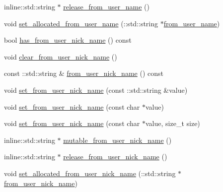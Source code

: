 \begin{DoxyCompactItemize}
\item 
inline\+::std\+::string $\ast$ \hyperlink{class_i_m_1_1_base_define_1_1_client_msg_info_a8624ef942e3870137370b2aa3bdf6dae}{release\+\_\+from\+\_\+user\+\_\+name} ()
\item 
void \hyperlink{class_i_m_1_1_base_define_1_1_client_msg_info_a566afc77ad72538f0868d49610a57e44}{set\+\_\+allocated\+\_\+from\+\_\+user\+\_\+name} (\+::std\+::string $\ast$\hyperlink{class_i_m_1_1_base_define_1_1_client_msg_info_a060e0792835ddff97e357b7a272e2b24}{from\+\_\+user\+\_\+name})
\item 
bool \hyperlink{class_i_m_1_1_base_define_1_1_client_msg_info_a04e89e498e131534844a34ac80b51e64}{has\+\_\+from\+\_\+user\+\_\+nick\+\_\+name} () const 
\item 
void \hyperlink{class_i_m_1_1_base_define_1_1_client_msg_info_aa51eaebe3f5cfc523a98f7a0da032b3c}{clear\+\_\+from\+\_\+user\+\_\+nick\+\_\+name} ()
\item 
const \+::std\+::string \& \hyperlink{class_i_m_1_1_base_define_1_1_client_msg_info_adbdf72fc39015be4ff758a5fdd28b256}{from\+\_\+user\+\_\+nick\+\_\+name} () const 
\item 
void \hyperlink{class_i_m_1_1_base_define_1_1_client_msg_info_a7419e1fd819fbfc3629b7c890bb6385d}{set\+\_\+from\+\_\+user\+\_\+nick\+\_\+name} (const \+::std\+::string \&value)
\item 
void \hyperlink{class_i_m_1_1_base_define_1_1_client_msg_info_a1ce4c2a9387e92f24d1c8f42a2ec2e01}{set\+\_\+from\+\_\+user\+\_\+nick\+\_\+name} (const char $\ast$value)
\item 
void \hyperlink{class_i_m_1_1_base_define_1_1_client_msg_info_af66214329b676d68b9497b98b882663e}{set\+\_\+from\+\_\+user\+\_\+nick\+\_\+name} (const char $\ast$value, size\+\_\+t size)
\item 
inline\+::std\+::string $\ast$ \hyperlink{class_i_m_1_1_base_define_1_1_client_msg_info_ab719bf758574d8d7804719018cb83ac6}{mutable\+\_\+from\+\_\+user\+\_\+nick\+\_\+name} ()
\item 
inline\+::std\+::string $\ast$ \hyperlink{class_i_m_1_1_base_define_1_1_client_msg_info_a1cbcb5ea010aecf8552655e7ebe67ac3}{release\+\_\+from\+\_\+user\+\_\+nick\+\_\+name} ()
\item 
void \hyperlink{class_i_m_1_1_base_define_1_1_client_msg_info_a0dc1dd606d12733224cecbe8b3cb489b}{set\+\_\+allocated\+\_\+from\+\_\+user\+\_\+nick\+\_\+name} (\+::std\+::string $\ast$\hyperlink{class_i_m_1_1_base_define_1_1_client_msg_info_adbdf72fc39015be4ff758a5fdd28b256}{from\+\_\+user\+\_\+nick\+\_\+name})

\end{DoxyCompactItemize}

